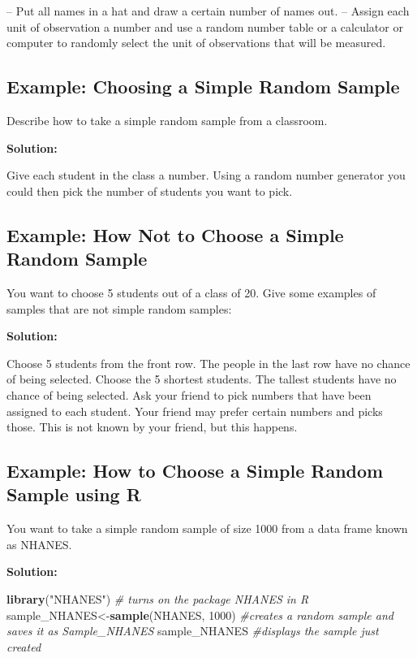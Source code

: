 \documentclass[]{book}
\newenvironment{Shaded}{\begin{snugshade}}{\end{snugshade}}
\newcommand{\CommentTok}[1]{\textcolor[rgb]{0.56,0.35,0.01}{\textit{#1}}}
\newcommand{\DecValTok}[1]{\textcolor[rgb]{0.00,0.00,0.81}{#1}}
\newcommand{\KeywordTok}[1]{\textcolor[rgb]{0.13,0.29,0.53}{\textbf{#1}}}
\newcommand{\NormalTok}[1]{#1}
\newcommand{\StringTok}[1]{\textcolor[rgb]{0.31,0.60,0.02}{#1}}
\begin{document}
-- Put all names in a hat and draw a certain number of names out.
-- Assign each unit of observation a number and use a random number table or a calculator or computer to randomly select the unit of observations that will be measured.

\hypertarget{example-choosing-a-simple-random-sample}{%
\subsection{Example: Choosing a Simple Random Sample}\label{example-choosing-a-simple-random-sample}}

Describe how to take a simple random sample from a classroom.

\textbf{Solution:}

Give each student in the class a number. Using a random number generator you could then pick the number of students you want to pick.

\hypertarget{example-how-not-to-choose-a-simple-random-sample}{%
\subsection{Example: How Not to Choose a Simple Random Sample}\label{example-how-not-to-choose-a-simple-random-sample}}

You want to choose 5 students out of a class of 20. Give some examples of samples that are {not} simple random samples:

\textbf{Solution:}

Choose 5 students from the front row. The people in the last row have no chance of being selected.
Choose the 5 shortest students. The tallest students have no chance of being selected.
Ask your friend to pick numbers that have been assigned to each student. Your friend may prefer certain numbers and picks those. This is not known by your friend, but this happens.

\hypertarget{example-how-to-choose-a-simple-random-sample-using-r}{%
\subsection{Example: How to Choose a Simple Random Sample using R}\label{example-how-to-choose-a-simple-random-sample-using-r}}

You want to take a simple random sample of size 1000 from a data frame known as NHANES.

\textbf{Solution:}

\begin{Shaded}
\begin{Highlighting}[]
\KeywordTok{library}\NormalTok{(}\StringTok{"NHANES"}\NormalTok{) }\CommentTok{# turns on the package NHANES in R}
\NormalTok{sample_NHANES<-}\KeywordTok{sample}\NormalTok{(NHANES, }\DecValTok{1000}\NormalTok{) }\CommentTok{#creates a random sample and saves it as Sample_NHANES}
\NormalTok{sample_NHANES }\CommentTok{#displays the sample just created}
\end{Highlighting}
\end{Shaded}
\end{document}

